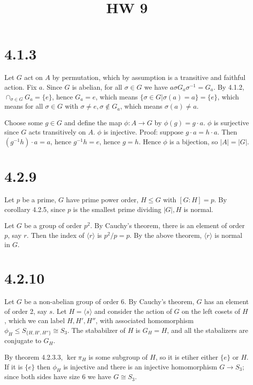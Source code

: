 \documentclass{article}
\title{HW 9}
\date{}
\def\<{\langle}
\def\>{\rangle}
\def\inv{{-1}}
\begin{document}
\maketitle

\section*{4.1.3}

Let $G$ act on $A$ by permutation, which by assumption is a transitive and faithful action. Fix $a$. Since $G$ is abelian, for all $\sigma \in G$ we have $a\sigma G_a \sigma^\inv = G_a$. By 4.1.2, $\cap_{\sigma \in G} G_a = \{e\}$, hence $G_a = e$, which means $\{\sigma \in G | \sigma(a) = a\} = \{e\}$, which means for all $\sigma \in G$ with $\sigma \ne e, \sigma \not \in G_a$, which means $\sigma(a) \ne a$.

Choose some $g \in G$ and define the map $\phi: A \to G$ by $\phi(g) = g \cdot a$. $\phi$ is surjective since $G$ acts transitively on $A$. $\phi$ is injective. Proof: suppose $g \cdot a = h \cdot a$. Then $(g^\inv h) \cdot a = a$, hence $g^\inv h = e$, hence $g = h$. Hence $\phi$ is a bijection, so $|A| = |G|$.

\section*{4.2.9}

Let $p$ be a prime, $G$ have prime power order, $H \le G$ with $[G:H] = p$. By corollary 4.2.5, since $p$ is the smallest prime dividing $|G|, H$ is normal.

Let $G$ be a group of order $p^2$. By Cauchy's theorem, there is an element of order $p$, say $r$. Then the index of $\<r\>$ is $p^2 / p = p$. By the above theorem, $\<r\>$ is normal in $G$.

\section*{4.2.10}

Let $G$ be a non-abelian group of order 6. By Cauchy's theorem, $G$ has an element of order 2, say $s$. Let $H = \<s\>$ and consider the action of $G$ on the left cosets of $H$, which we can label $H, H', H''$, with associated homomorphism $\phi_H \le S_{\{H, H', H''\}} \cong S_3$. The stababilzer of $H$ is $G_H = H$, and all the stabalizers are conjugate to $G_H$. 

By theorem 4.2.3.3, $\ker \pi_H$ is some subgroup of $H$, so it is etiher either $\{e\}$ or $H$. If it is $\{e\}$ then $\phi_H$ is injective and there is an injective homomorphism $G \to S_3$; since both sides have size 6 we have $G \cong S_3$. 
\end{document}
